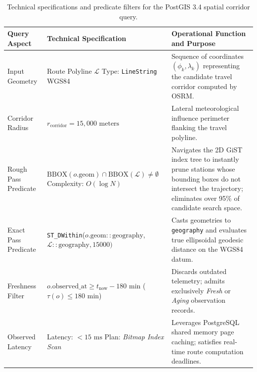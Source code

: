\begin{table}[H]
\centering
\small
\caption[PostGIS corridor spatial query technical specifications]{Technical specifications and predicate filters for the PostGIS 3.4 spatial corridor query.}
\label{tab:gist_query_spec_en}
\begin{tabularx}{\textwidth}{>{\raggedright\arraybackslash}p{2.6cm} >{\raggedright\arraybackslash}p{4.0cm} X}
\toprule
\textbf{Query Aspect} & \textbf{Technical Specification} & \textbf{Operational Function and Purpose} \\
\midrule
Input Geometry & Route Polyline $\mathcal{L}$ \newline Type: \texttt{LineString} WGS84 & Sequence of coordinates $(\phi_k, \lambda_k)$ representing the candidate travel corridor computed by OSRM. \\
\addlinespace
Corridor Radius & $r_{\text{corridor}} = 15,000\text{ meters}$ & Lateral meteorological influence perimeter flanking the travel polyline. \\
\addlinespace
Rough Pass \newline Predicate & $\text{BBOX}(o.\text{geom}) \cap \text{BBOX}(\mathcal{L}) \ne \emptyset$ \newline Complexity: $O(\log N)$ & Navigates the 2D GiST index tree to instantly prune stations whose bounding boxes do not intersect the trajectory; eliminates over 95\% of candidate search space. \\
\addlinespace
Exact Pass \newline Predicate & \texttt{ST\_DWithin}($o.\text{geom}::\text{geography}$, \newline $\mathcal{L}::\text{geography}, 15000)$ & Casts geometries to \texttt{geography} and evaluates true ellipsoidal geodesic distance on the WGS84 datum. \\
\addlinespace
Freshness Filter & $o.\text{observed\_at} \ge t_{\text{now}} - 180\text{ min}$ \newline ($\tau(o) \le 180\text{ min}$) & Discards outdated telemetry; admits exclusively \textit{Fresh} or \textit{Aging} observation records. \\
\addlinespace
Observed Latency & Latency: $< 15\text{ ms}$ \newline Plan: \textit{Bitmap Index Scan} & Leverages PostgreSQL shared memory page caching; satisfies real-time route computation deadlines. \\
\bottomrule
\end{tabularx}
\end{table}

